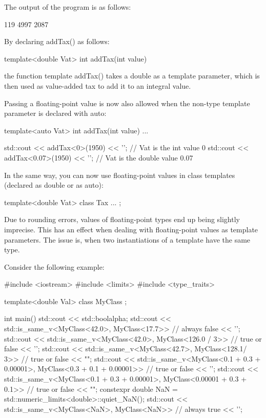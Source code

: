 The output of the program is as follows:

\begin{shell}
119
4997
2087
\end{shell}

By declaring addTax() as follows:

\begin{cpp}
template<double Vat>
int addTax(int value)
\end{cpp}

the function template addTax() takes a double as a template parameter, which is then used as value-added tax to add it to an integral value.

Passing a floating-point value is now also allowed when the non-type template parameter is declared with auto:

\begin{cpp}
template<auto Vat>
int addTax(int value)
{
	...
}

std::cout << addTax<0>(1950) << '\n'; // Vat is the int value 0
std::cout << addTax<0.07>(1950) << '\n'; // Vat is the double value 0.07
\end{cpp}

In the same way, you can now use floating-point values in class templates (declared as double or as auto):

\begin{cpp}
template<double Vat>
class Tax {
	...
};
\end{cpp}


Due to rounding errors, values of floating-point types end up being slightly imprecise. This has an effect when dealing with floating-point values as template parameters. The issue is, when two instantiations of a template have the same type.

Consider the following example:


\begin{cpp}
#include <iostream>
#include <limits>
#include <type_traits>

template<double Val>
class MyClass {
};

int main()
{
	std::cout << std::boolalpha;
	std::cout << std::is_same_v<MyClass<42.0>, MyClass<17.7>> // always false
			  << '\n';
	std::cout << std::is_same_v<MyClass<42.0>, MyClass<126.0 / 3>> // true or false
			  << '\n';
	std::cout << std::is_same_v<MyClass<42.7>, MyClass<128.1/ 3>> // true or false
			  << "\n\n";
	std::cout << std::is_same_v<MyClass<0.1 + 0.3 + 0.00001>,
	MyClass<0.3 + 0.1 + 0.00001>> // true or false
			  << '\n';
	std::cout << std::is_same_v<MyClass<0.1 + 0.3 + 0.00001>,
	MyClass<0.00001 + 0.3 + 0.1>> // true or false
			  << "\n\n";
	constexpr double NaN = std::numeric_limits<double>::quiet_NaN();
	std::cout << std::is_same_v<MyClass<NaN>, MyClass<NaN>> // always true
			  << '\n';
}
\end{cpp}

